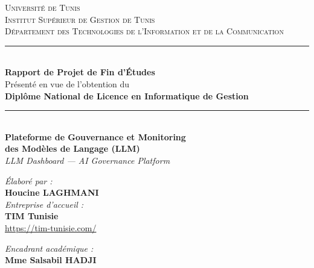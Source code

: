 
\begin{titlepage}
\begin{center}

\vspace*{-1cm}


\textsc{\Large Université de Tunis}\\[0.3cm]
\textsc{\large Institut Supérieur de Gestion de Tunis}\\[0.2cm]
\textsc{Département des Technologies de l'Information et de la Communication}\\[1.5cm]

\rule{\textwidth}{1.5pt}\\[0.4cm]

{\Large \textbf{Rapport de Projet de Fin d'Études}}\\[0.3cm]
{\large Présenté en vue de l'obtention du}\\[0.2cm]
{\large \textbf{Diplôme National de Licence en Informatique de Gestion}}\\[0.5cm]

\rule{\textwidth}{1.5pt}\\[1.2cm]

{\LARGE \textbf{Plateforme de Gouvernance et Monitoring}}\\[0.3cm]
{\LARGE \textbf{des Modèles de Langage (LLM)}}\\[0.4cm]
{\large \textit{LLM Dashboard — AI Governance Platform}}\\[1.5cm]

\begin{minipage}[t]{0.45\textwidth}
\begin{flushleft}
\textit{Élaboré par :}\\[0.3cm]
\textbf{Houcine LAGHMANI}\\[1cm]

\textit{Entreprise d'accueil :}\\[0.3cm]
\textbf{TIM Tunisie}\\
\url{https://tim-tunisie.com/}
\end{flushleft}
\end{minipage}
\hfill
\begin{minipage}[t]{0.45\textwidth}
\begin{flushright}
\textit{Encadrant académique :}\\[0.3cm]
\textbf{Mme Salsabil HADJI}\\[1cm]


\end{flushright}
\end{minipage}
\end{center}
\end{titlepage}

